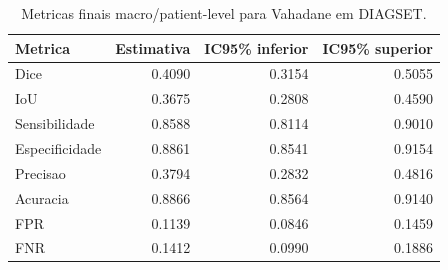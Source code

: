 \begin{table}[!htb]
\centering
\caption{Metricas finais macro/patient-level para Vahadane em DIAGSET.}
\label{tab:results_diagset-macro-vahadane}
\small
\begin{tabular}{lrrr}
\toprule
Metrica & Estimativa & IC95\% inferior & IC95\% superior \\
\midrule
Dice & 0.4090 & 0.3154 & 0.5055 \\
IoU & 0.3675 & 0.2808 & 0.4590 \\
Sensibilidade & 0.8588 & 0.8114 & 0.9010 \\
Especificidade & 0.8861 & 0.8541 & 0.9154 \\
Precisao & 0.3794 & 0.2832 & 0.4816 \\
Acuracia & 0.8866 & 0.8564 & 0.9140 \\
FPR & 0.1139 & 0.0846 & 0.1459 \\
FNR & 0.1412 & 0.0990 & 0.1886 \\
\bottomrule
\end{tabular}
\end{table}
